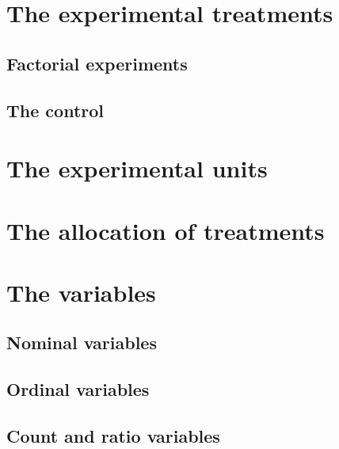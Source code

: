\documentclass[a4paper,12pt,oneside]{book}
\begin{document}
\hypertarget{the-experimental-treatments}{%
\section{The experimental treatments}\label{the-experimental-treatments}}

\hypertarget{factorial-experiments}{%
\subsection{Factorial experiments}\label{factorial-experiments}}

\hypertarget{the-control}{%
\subsection{The control}\label{the-control}}

\hypertarget{the-experimental-units}{%
\section{The experimental units}\label{the-experimental-units}}

\hypertarget{the-allocation-of-treatments}{%
\section{The allocation of treatments}\label{the-allocation-of-treatments}}

\hypertarget{the-variables}{%
\section{The variables}\label{the-variables}}

\hypertarget{nominal-variables}{%
\subsection{Nominal variables}\label{nominal-variables}}

\hypertarget{ordinal-variables}{%
\subsection{Ordinal variables}\label{ordinal-variables}}

\hypertarget{count-and-ratio-variables}{%
\subsection{Count and ratio variables}\label{count-and-ratio-variables}}
\end{document}
